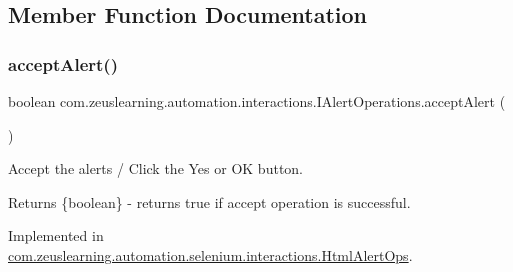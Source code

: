 \subsection{Member Function Documentation}
\hypertarget{interfacecom_1_1zeuslearning_1_1automation_1_1interactions_1_1IAlertOperations_a8be09398358c0a51e5ff2058969853fd}{}\label{interfacecom_1_1zeuslearning_1_1automation_1_1interactions_1_1IAlertOperations_a8be09398358c0a51e5ff2058969853fd} 
\subsubsection{\texorpdfstring{accept\+Alert()}{acceptAlert()}}
{\footnotesize\ttfamily boolean com.\+zeuslearning.\+automation.\+interactions.\+I\+Alert\+Operations.\+accept\+Alert (\begin{DoxyParamCaption}{ }\end{DoxyParamCaption})}

Accept the alerts / Click the {\ttfamily Yes} or {\ttfamily OK} button.

\begin{DoxyReturn}{Returns}
\{boolean\} -\/ returns {\ttfamily true} if accept operation is successful. 
\end{DoxyReturn}


Implemented in \hyperlink{classcom_1_1zeuslearning_1_1automation_1_1selenium_1_1interactions_1_1HtmlAlertOps_ab29d982ce85b76e2f85b09d0c724f331}{com.\+zeuslearning.\+automation.\+selenium.\+interactions.\+Html\+Alert\+Ops}.

\hypertarget{interfacecom_1_1zeuslearning_1_1automation_1_1interactions_1_1IAlertOperations_a0c8a54b5a80611b77880dd4cc999e88d}{}\label{interfacecom_1_1zeuslearning_1_1automation_1_1interactions_1_1IAlertOperations_a0c8a54b5a80611b77880dd4cc999e88d} 
